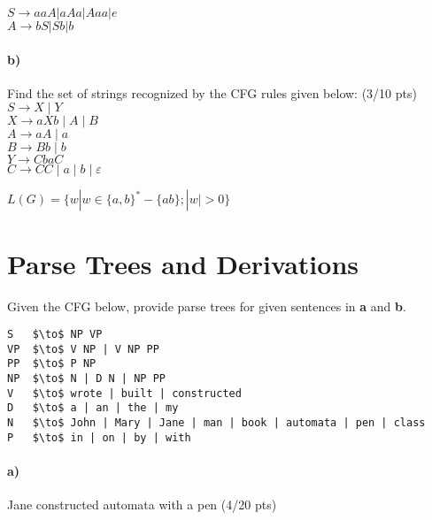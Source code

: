 \documentclass[a4paper,12pt]{article}
\begin{document}
\begin{tcolorbox}

$S \rightarrow aaA| aAa | Aaa| e$\\
$A \rightarrow bS| Sb | b $ \\


\end{tcolorbox}



\paragraph{b)} Find the set of strings recognized by the CFG rules given below:         \hfill \small{(3/10 pts)} \\


$S \to X \mid Y$ \\
$X \to aXb \mid A \mid B$ \\
$A \to aA \mid a$ \\
$B \to Bb \mid b$ \\
$Y \to CbaC$ \\
$C \to CC \mid a \mid b \mid \varepsilon$  \\

\begin{tcolorbox}
$ L(G) = \{w | w \in \{a,b\}^* - \{ab\}; |w| > 0\}$\\
\end{tcolorbox}


\newpage
\section{Parse Trees and Derivations \hfill {}}
Given the CFG below, provide parse trees for given sentences in \textbf{a} and \textbf{b}.\\

\begin{lstlisting}[style=output,mathescape=true]
S   $\to$ NP VP
VP  $\to$ V NP | V NP PP
PP  $\to$ P NP
NP  $\to$ N | D N | NP PP
V   $\to$ wrote | built | constructed
D   $\to$ a | an | the | my
N   $\to$ John | Mary | Jane | man | book | automata | pen | class
P   $\to$ in | on | by | with
\end{lstlisting}

\paragraph{a)} Jane constructed automata with a pen \hfill \small{(4/20 pts)} \\
\end{document}
